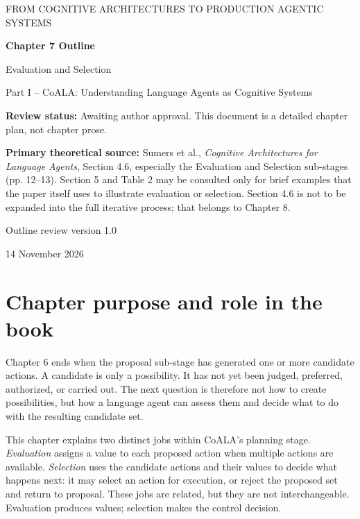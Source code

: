 


\thispagestyle{empty}
\begin{center}
{\sffamily\Large\color{BookBlue} FROM COGNITIVE ARCHITECTURES TO PRODUCTION AGENTIC SYSTEMS\par}
\vspace{1.2cm}
{\sffamily\huge\bfseries\color{BookBlue} Chapter 7 Outline\par}
\vspace{0.45cm}
{\sffamily\LARGE Evaluation and Selection\par}
\vspace{0.8cm}
{\large Part I -- CoALA: Understanding Language Agents as Cognitive Systems\par}
\vfill
\begin{learningbox}
\textbf{Review status:} Awaiting author approval. This document is a detailed chapter plan, not chapter prose.

\textbf{Primary theoretical source:} Sumers et al., \emph{Cognitive Architectures for Language Agents}, Section 4.6, especially the Evaluation and Selection sub-stages (pp. 12--13). Section 5 and Table 2 may be consulted only for brief examples that the paper itself uses to illustrate evaluation or selection. Section 4.6 is not to be expanded into the full iterative process; that belongs to Chapter 8.
\end{learningbox}
\vfill
{\sffamily\large Outline review version 1.0\par}
{\small 14 November 2026\par}
\end{center}
\clearpage

\setcounter{chapter}{7}
\section{Chapter purpose and role in the book}
Chapter 6 ends when the proposal sub-stage has generated one or more candidate actions. A candidate is only a possibility. It has not yet been judged, preferred, authorized, or carried out. The next question is therefore not how to create possibilities, but how a language agent can assess them and decide what to do with the resulting candidate set.

This chapter explains two distinct jobs within CoALA's planning stage. \emph{Evaluation} assigns a value to each proposed action when multiple actions are available. \emph{Selection} uses the candidate actions and their values to decide what happens next: it may select an action for execution, or reject the proposed set and return to proposal. These jobs are related, but they are not interchangeable. Evaluation produces values; selection makes the control decision.

